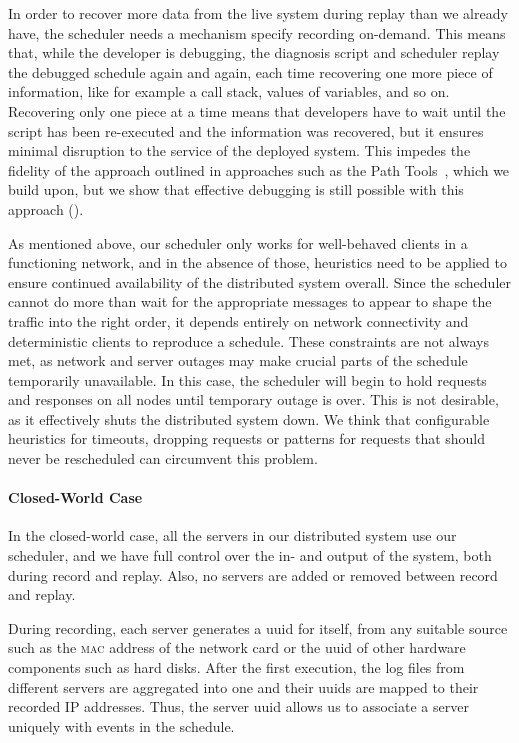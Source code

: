 In order to recover more data from the live system during replay than
we already have, the scheduler needs a mechanism specify recording
on-demand. This means that, while the developer is debugging, the
diagnosis script and scheduler replay the debugged schedule again and
again, each time recovering one more piece of information, like for
example a call stack, values of variables, and so on. Recovering only
one piece at a time means that developers have to wait until the
script has been re-executed and the information was recovered, but it
ensures minimal disruption to the service of the deployed system. This
impedes the fidelity of the approach outlined in approaches such as
the Path Tools~\cite{Perscheid2010}, which we build upon, but we show
that effective debugging is still possible with this approach
().

As mentioned above, our scheduler only works for well-behaved clients
in a functioning network, and in the absence of those, heuristics need
to be applied to ensure continued availability of the distributed
system overall. Since the scheduler cannot do more than wait for the
appropriate messages to appear to shape the traffic into the right
order, it depends entirely on network connectivity and deterministic
clients to reproduce a schedule. These constraints are not always met,
as network and server outages may make crucial parts of the schedule
temporarily unavailable. In this case, the scheduler will begin to
hold requests and responses on all nodes until temporary outage is
over. This is not desirable, as it effectively shuts the distributed
system down. We think that configurable heuristics for timeouts,
dropping requests or patterns for requests that should never be
rescheduled can circumvent this problem.

\paragraph{Closed-World Case}
\label{sec:clos-world-case}

In the closed-world case, all the servers in our distributed system
use our scheduler, and we have full control over the in- and output of
the system, both during record and replay. Also, no servers are added
or removed between record and replay.

During recording, each server generates a \ac{uuid} for itself, from
any suitable source such as the \textsc{mac} address of the network
card or the \ac{uuid} of other hardware components such as hard
disks. After the first execution, the log files from different servers
are aggregated into one and their \acp{uuid} are mapped to their
recorded \textsc{IP} addresses. Thus, the server \ac{uuid} allows us
to associate a server uniquely with events in the schedule.

